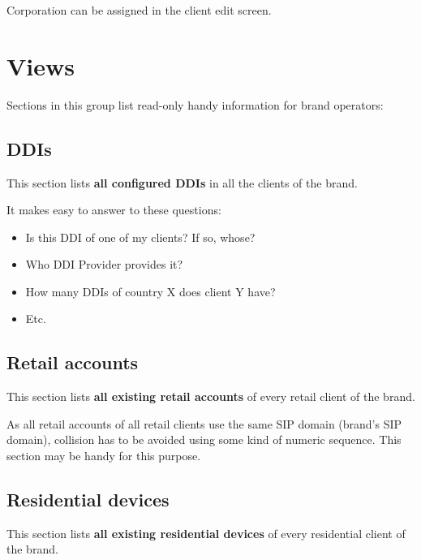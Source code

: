 \documentclass[letterpaper,10pt,spanish]{sphinxmanual}
\begin{document}
Corporation can be assigned in the client edit screen.


\section{Views}
\label{administration_portal/brand/views/index::doc}\label{administration_portal/brand/views/index:views}
Sections in this group list read-only handy information for brand operators:


\subsection{DDIs}
\label{administration_portal/brand/views/ddis:ddis}\label{administration_portal/brand/views/ddis::doc}\label{administration_portal/brand/views/ddis:id1}
This section lists \textbf{all configured DDIs} in all the clients of the brand.

It makes easy to answer to these questions:
\begin{itemize}
\item {} 
Is this DDI of one of my clients? If so, whose?

\item {} 
Who DDI Provider provides it?

\item {} 
How many DDIs of country X does client Y have?

\item {} 
Etc.

\end{itemize}


\subsection{Retail accounts}
\label{administration_portal/brand/views/retail_accounts::doc}\label{administration_portal/brand/views/retail_accounts:retail-accounts}
This section lists \textbf{all existing retail accounts} of every retail client of the brand.

As all retail accounts of all retail clients use the same SIP domain (brand's SIP domain), collision has to be
avoided using some kind of numeric sequence. This section may be handy for this purpose.


\subsection{Residential devices}
\label{administration_portal/brand/views/residential_devices::doc}\label{administration_portal/brand/views/residential_devices:residential-devices}
This section lists \textbf{all existing residential devices} of every residential client of the brand.
\end{document}
